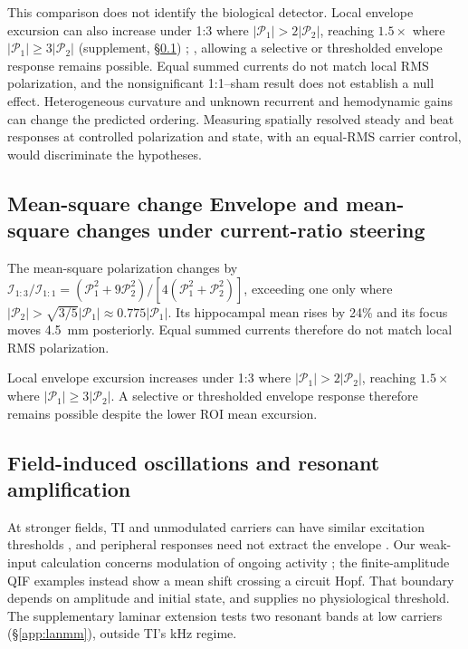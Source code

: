 \documentclass[11pt,a4paper]{article}
\newif\ifjne
\providecommand{\DIFaddtex}[1]{{\protect\color{blue} \sf #1}} %
\providecommand{\DIFdeltex}[1]{{\protect\color{red} \scriptsize #1}} %
\providecommand{\DIFaddbegin}{} %
\providecommand{\DIFaddend}{} %
\providecommand{\DIFdelbegin}{} %
\providecommand{\DIFdelend}{} %
\providecommand{\DIFadd}[1]{\texorpdfstring{\DIFaddtex{#1}}{#1}} %
\providecommand{\DIFdel}[1]{\texorpdfstring{\DIFdeltex{#1}}{}} %
\begin{document}
This comparison does not identify the biological detector. Local envelope excursion can \DIFaddbegin \DIFadd{also }\DIFaddend increase under 1:3
\DIFdelbegin \DIFdel{where $|\mathcal P_1|>2|\mathcal P_2|$,
reaching $1.5\times$ where $|\mathcal P_1|\geq3|\mathcal P_2|$ }\DIFdelend (supplement, \S\ref{supp:steering-algebra})\DIFdelbegin \DIFdel{; }\DIFdelend \DIFaddbegin \DIFadd{, allowing }\DIFaddend a selective or
thresholded envelope response\DIFdelbegin \DIFdel{remains possible}\DIFdelend . Equal summed currents do not match local RMS polarization,
and the nonsignificant 1:1--sham result does not establish a null effect.
Heterogeneous curvature and unknown recurrent and hemodynamic gains can change
the predicted ordering. Measuring spatially resolved steady and beat responses
at controlled polarization and state, with an equal-RMS carrier control,
would discriminate the hypotheses.
\ifjne\else
\subsection{\DIFdelbegin \DIFdel{Mean-square change }\DIFdelend \DIFaddbegin \DIFadd{Envelope and mean-square changes }\DIFaddend under current-ratio steering}\label{supp:steering-algebra}
The mean-square polarization
changes by $\mathcal I_{1:3}/\mathcal I_{1:1}
=(\mathcal P_1^2+9\mathcal P_2^2)/[4(\mathcal P_1^2+\mathcal P_2^2)]$,
exceeding one only where $|\mathcal P_2|>\sqrt{3/5}|\mathcal P_1|
\approx0.775|\mathcal P_1|$. Its hippocampal mean rises by 24\% and its focus
moves 4.5~mm posteriorly. Equal summed currents therefore do not match local
RMS polarization.

\DIFaddbegin \DIFadd{Local envelope excursion increases under 1:3 where
$|\mathcal P_1|>2|\mathcal P_2|$, reaching $1.5\times$ where
$|\mathcal P_1|\geq3|\mathcal P_2|$. A selective or thresholded envelope
response therefore remains possible despite the lower ROI mean excursion.
}

\DIFaddend \fi

\subsection{Field-induced oscillations and resonant amplification}
At stronger fields, TI and unmodulated carriers can have similar excitation
thresholds \cite{opancar2025,semenov2025}, and peripheral responses need not
extract the envelope \cite{peripheral2023}. Our weak-input calculation concerns
modulation of ongoing activity \cite{vieira2024}; the finite-amplitude
QIF examples instead show a mean shift crossing a circuit Hopf. That boundary
depends on amplitude and initial state, and supplies no physiological threshold.
The supplementary laminar extension tests two resonant bands at low carriers
(\S\ref{app:lanmm}), outside TI's kHz regime.
\end{document}
